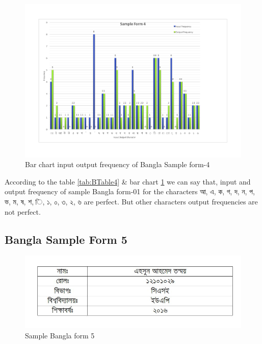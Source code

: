 \begin{figure}[H]
\centering
\includegraphics[width=1\textwidth]{Bform4.pdf}
\caption {Bar chart input output frequency of Bangla Sample form-4}
\label {fig:Bbar4}
\end{figure}

According to the table \ref{tab:BTable4} \& bar chart \ref{fig:Bbar4} we can say that, input and output frequency of sample Bangla form-01 for the characters {\bengalifont আ, এ, ক, গ, দ, ন, প, ভ, ম, ষ, শ, ি, ১, ০, ৩, ২, ৬ }are perfect. But other characters output frequencies are not perfect.

\subsection{Bangla Sample Form 5}
\begin{figure}[H]
\centering
\includegraphics[width=1\textwidth]{formBen05.JPG}
\caption {Sample Bangla form 5}
\label {fig:FormBan5}
\end{figure}

